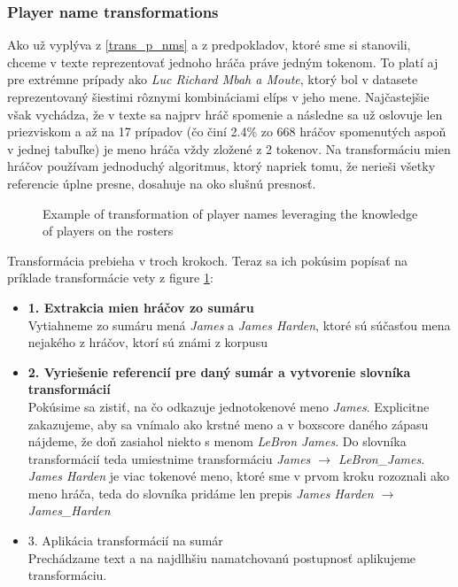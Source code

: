 \subsubsection{Player name transformations} \label{player_nm_trans_summary}

Ako už vyplýva z \ref{trans_p_nms} a z predpokladov, ktoré sme si stanovili, chceme v texte reprezentovať jednoho hráča práve jedným tokenom. To platí aj pre extrémne prípady ako \emph{Luc Richard Mbah a Moute}, ktorý bol v datasete reprezentovaný šiestimi rôznymi kombináciami elíps v jeho mene. Najčastejšie však vychádza, že v texte sa najprv hráč spomenie a následne sa už oslovuje len priezviskom a až na 17 prípadov (čo činí 2.4\% zo 668 hráčov spomenutých aspoň v jednej tabuľke) je meno hráča vždy zložené z 2 tokenov. Na transformáciu mien hráčov používam jednoduchý algoritmus, ktorý napriek tomu, že nerieši všetky referencie úplne presne, dosahuje na oko slušnú presnosť.

\begin{figure}[!h]
\centering
\usetikzlibrary{shapes.multipart}
\caption{Example of transformation of player names leveraging the knowledge of players on the rosters} \label{cmp_original_vs_mine}
\end{figure}

Transformácia prebieha v troch krokoch. Teraz sa ich pokúsim popísať na príklade transformácie vety z figure \ref{cmp_original_vs_mine}:
\begin{itemize}
    \item \textbf{1. Extrakcia mien hráčov zo sumáru} \hfill \\
    Vytiahneme zo sumáru mená \emph{James} a \emph{James Harden}, ktoré sú súčasťou mena nejakého z hráčov, ktorí sú známi z korpusu
    \item \textbf{2. Vyriešenie referencií pre daný sumár a vytvorenie slovníka transformácií} \hfill \\
    Pokúsime sa zistiť, na čo odkazuje jednotokenové meno \emph{James}. Explicitne zakazujeme, aby sa vnímalo ako krstné meno a v boxscore daného zápasu nájdeme, že doň zasiahol niekto s menom \emph{LeBron James}. Do slovníka transformácií teda umiestnime transformáciu \emph{James $\rightarrow$ LeBron\_James}. \emph{James Harden} je viac tokenové meno, ktoré sme v prvom kroku rozoznali ako meno hráča, teda do slovníka pridáme len prepis \emph{James Harden $\rightarrow$ James\_Harden}
    \item 3. Aplikácia transformácií na sumár \hfill \\
    Prechádzame text a na najdlhšiu namatchovanú postupnosť aplikujeme transformáciu.
\end{itemize}

